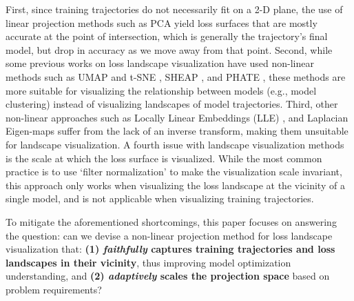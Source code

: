 \documentclass[letterpaper]{article} %
\begin{document}
                First, since training trajectories do not necessarily fit on a 2-D plane, the use of linear projection methods such as PCA yield loss surfaces that are mostly accurate at the point of intersection, 
                which is generally the trajectory's final model, 
                but drop in accuracy as we move away from that point. 
                Second, while 
                some previous works on loss landscape visualization have used non-linear methods such as UMAP and t-SNE \cite{pmlr-v137-huang20a}, SHEAP \cite{PhysRevX.11.041026}, and PHATE \cite{phate}, these methods are more suitable for visualizing the relationship between models (e.g., model clustering) instead of visualizing {landscapes} of model trajectories. %
                Third, other non-linear approaches such as Locally Linear Embeddings (LLE) \cite{doi:10.1126/science.290.5500.2323}, and Laplacian Eigen-maps \cite{Wang2012} suffer from the lack of an inverse transform, 
                making them unsuitable for landscape visualization.
                    A fourth issue with landscape visualization methods is the scale at which the loss surface is visualized. While the most common practice is to use `filter normalization' \cite{NIPS2018_7875} to make the visualization scale invariant, this approach only works when visualizing the loss landscape at the vicinity of a single model, and is not applicable when visualizing training trajectories. 
                
                To mitigate the aforementioned shortcomings, this paper focuses on answering the question: can we devise a non-linear projection method for loss landscape visualization that: \textbf{(1) \textit{faithfully} captures training trajectories and loss landscapes in their vicinity}, thus improving model optimization understanding, and \textbf{(2) \textit{adaptively} scales the projection space} based on problem requirements?
                
\end{document}
